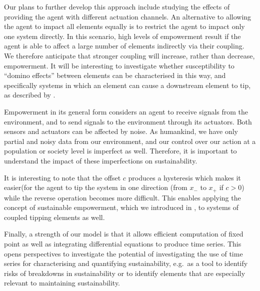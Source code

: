 \documentclass[letterpaper]{article}
\begin{document}
Our plans to further develop this approach include studying the
effects of providing the agent with different actuation channels. An
alternative to allowing the agent to impact all elements equally is to
restrict the agent to impact only one system directly. In this
scenario, high levels of empowerment result if the agent is able to
affect a large number of elements indirectly via their coupling. We
therefore anticipate that stronger coupling will increase, rather than
decrease, empowerment. It will be interesting to investigate whether
susceptibility to ``domino effects'' between elements can be
characterised in this way, and specifically systems in which an
element can cause a downstream element to tip, as described by
\citet{Brummitt2015_coupledcatastrophes}.

Empowerment in its general form considers an agent to receive signals
from the environment, and to send signals to the environment through
its actuators. Both sensors and actuators can be affected by noise. As
humankind, we have only partial and noisy data from our environment,
and our control over our action at a population or society level is
imperfect as well. Therefore, it is important to understand the impact
of these imperfections on sustainability.



It is interesting to note that the offset $c$ produces a hysteresis
which makes it easier(for the agent to tip the system in one direction
(from $x_{-}$ to $x_{+}$ if $c > 0$) while the reverse operation
becomes more difficult. This enables applying the concept of
sustainable empowerment, which we introduced in
\citet{Kim2009_sustainability}, to systems of coupled tipping elements
as well.

Finally, a strength of our model is that it allows efficient
computation of fixed point as well as integrating differential
equations to produce time series. This opens perspectives to
investigate the potential of investigating the use of time series for
characterising and quantifying sustainability, e.g.\ as a tool to
identify risks of breakdowns in sustainability or to identify elements
that are especially relevant to maintaining sustainability.

\end{document}
